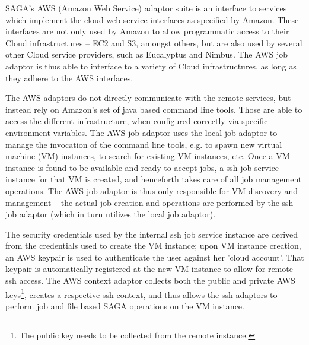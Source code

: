 \documentclass[conference,final]{IEEEtran}
\begin{document}
SAGA's AWS (Amazon Web Service) adaptor suite is
an interface to services which implement the cloud web service
interfaces as specified by Amazon. %
These interfaces are not only used by Amazon to allow programmatic
access to their Cloud infrastructures -- EC2 and S3, amongst others,
but are also used by several other Cloud service providers, such as
Eucalyptus\cite{eucalyptus} and Nimbus.  The AWS job adaptor is thus able to
interface to a variety of Cloud infrastructures, as long as they
adhere to the AWS interfaces.

The AWS adaptors do not directly communicate with the remote services,
but instead rely on Amazon's set of java based command line tools.
Those are able to access the different infrastructure, when configured
correctly via specific environment variables.  The AWS job adaptor
uses the local job adaptor to manage the invocation of the command
line tools, e.g. to spawn new virtual machine (VM) instances, to
search for existing VM instances, etc.  Once a VM instance is found to
be available and ready to accept jobs, a ssh job service instance for
that VM is created, and henceforth takes care of all job management
operations.  The AWS job adaptor is thus only responsible for VM
discovery and management -- the actual job creation and operations are
performed by the ssh job adaptor (which in turn utilizes the local job
adaptor).

The security credentials used by the internal ssh job service
instance are derived from the credentials used to create 
the VM instance; upon VM instance creation, an AWS keypair is
used to authenticate the user against her 'cloud account'.  That
keypair is automatically registered at the new VM instance to allow
for remote ssh access.  The AWS context adaptor collects both the
public and private AWS keys\footnote{The public key needs to be
  collected from the remote instance.}, creates a respective ssh
context, and thus allows the ssh adaptors to perform job and file
based SAGA operations on the VM instance.
\end{document}
